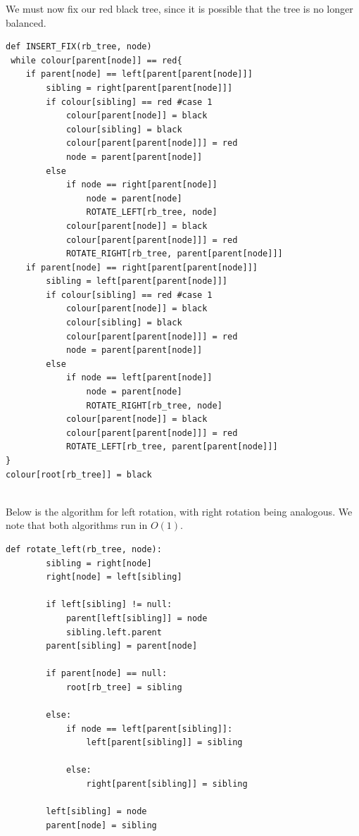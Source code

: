 \documentclass[12pt]{article}
\theoremstyle{definition}
\theoremstyle{remark}
\begin{document}
\begin{enumerate}
\begin{enumerate}
We must now fix our red black tree, since it is possible that the tree is no longer balanced. 

\begin{lstlisting}[caption = Fix for the red black tree]
def INSERT_FIX(rb_tree, node)
 while colour[parent[node]] == red{
    if parent[node] == left[parent[parent[node]]] 
        sibling = right[parent[parent[node]]] 
        if colour[sibling] == red #case 1
            colour[parent[node]] = black 
            colour[sibling] = black
            colour[parent[parent[node]]] = red
            node = parent[parent[node]]
        else 
            if node == right[parent[node]] 
                node = parent[node]
                ROTATE_LEFT[rb_tree, node]
            colour[parent[node]] = black
            colour[parent[parent[node]]] = red 
            ROTATE_RIGHT[rb_tree, parent[parent[node]]]
    if parent[node] == right[parent[parent[node]]] 
        sibling = left[parent[parent[node]]] 
        if colour[sibling] == red #case 1
            colour[parent[node]] = black 
            colour[sibling] = black
            colour[parent[parent[node]]] = red
            node = parent[parent[node]]
        else 
            if node == left[parent[node]] 
                node = parent[node]
                ROTATE_RIGHT[rb_tree, node]
            colour[parent[node]] = black
            colour[parent[parent[node]]] = red 
            ROTATE_LEFT[rb_tree, parent[parent[node]]]
}
colour[root[rb_tree]] = black
    
\end{lstlisting}

Below is the algorithm for left rotation, with right rotation being analogous. We note that both algorithms run in $O(1).$
\begin{lstlisting}
def rotate_left(rb_tree, node):
        sibling = right[node]
        right[node] = left[sibling]
        
        if left[sibling] != null:
            parent[left[sibling]] = node
            sibling.left.parent
        parent[sibling] = parent[node]
        
        if parent[node] == null:
            root[rb_tree] = sibling
            
        else:
            if node == left[parent[sibling]]:
                left[parent[sibling]] = sibling
                
            else:
                right[parent[sibling]] = sibling
                
        left[sibling] = node
        parent[node] = sibling
\end{lstlisting}




\end{enumerate}
\end{enumerate}
\end{document}
